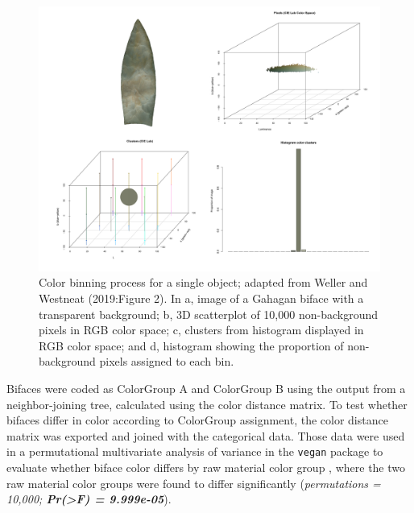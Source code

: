 \documentclass[]{interact}
\theoremstyle{plain}%
\theoremstyle{definition}
\theoremstyle{remark}
\begin{document}
\begin{figure}
\includegraphics[width=1\linewidth]{ms_files/figure-latex/fig3} \caption{Color binning process for a single object; adapted from Weller and Westneat (2019:Figure 2). In a, image of a Gahagan biface with a transparent background; b, 3D scatterplot of 10,000 non-background pixels in RGB color space; c, clusters from histogram displayed in RGB color space; and d, histogram showing the proportion of non-background pixels assigned to each bin.}\label{fig:colorout}
\end{figure}

Bifaces were coded as ColorGroup A and ColorGroup B using the output
from a neighbor-joining tree, calculated using the color distance
matrix. To test whether bifaces differ in color according to ColorGroup
assignment, the color distance matrix was exported and joined with the
categorical data. Those data were used in a permutational multivariate
analysis of variance in the \texttt{vegan} package to evaluate whether
biface color differs by raw material color group \citep{R, vegan}, where
the two raw material color groups were found to differ significantly
(\emph{permutations = 10,000; \textbf{Pr(\textgreater F) = 9.999e-05}}).
\end{document}
